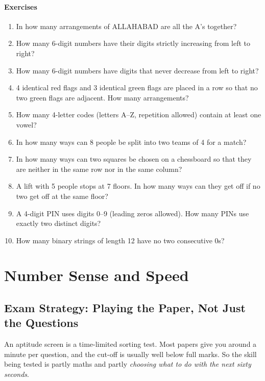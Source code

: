 \documentclass[11pt,a4paper,openany]{report}
\newenvironment{exercises}{\subsection*{Exercises \thechapter}\begin{enumerate}[label=\textbf{\thechapter.\arabic*},leftmargin=3.2em]}{\end{enumerate}}
\begin{document}
\begin{exercises}
\item In how many arrangements of ALLAHABAD are all the A's together?
\item How many 6-digit numbers have their digits strictly increasing from left to right?
\item How many 6-digit numbers have digits that never decrease from left to right?
\item 4 identical red flags and 3 identical green flags are placed in a row so that no two green flags are adjacent. How many arrangements?
\item How many 4-letter codes (letters A--Z, repetition allowed) contain at least one vowel?
\item In how many ways can 8 people be split into two teams of 4 for a match?
\item In how many ways can two squares be chosen on a chessboard so that they are neither in the same row nor in the same column?
\item A lift with 5 people stops at 7 floors. In how many ways can they get off if no two get off at the same floor?
\item A 4-digit PIN uses digits 0--9 (leading zeros allowed). How many PINs use exactly two distinct digits?
\item How many binary strings of length 12 have no two consecutive 0s?
\end{exercises}
\part{Number Sense and Speed}
\chapter{Exam Strategy: Playing the Paper, Not Just the Questions}\label{ch:strategy}

An aptitude screen is a time-limited sorting test. Most papers give you around a minute per question, and the cut-off is
usually well below full marks. So the skill being tested is partly maths and partly \emph{choosing what to do with the next sixty seconds}.
\end{document}
